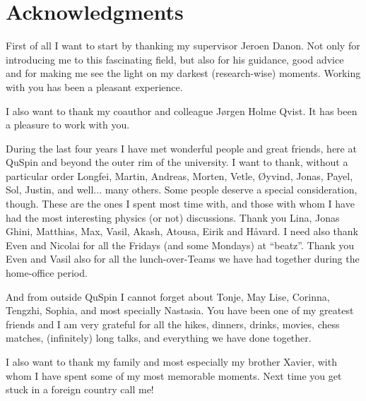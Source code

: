 
\chapter*{Acknowledgments\label{sec:ack}}

First of all I want to start by thanking my supervisor Jeroen Danon. Not only for introducing me to this fascinating field, but also for his guidance, good advice and for making me see the light on my darkest (research-wise) moments. Working with you has been a pleasant experience.

I also want to thank my coauthor and colleague J{\o}rgen Holme Qvist. It has been a pleasure to work with you.

During the last four years I have met wonderful people and great friends, here at QuSpin and beyond the outer rim of the university. I want to thank, without a particular order Longfei, Martin, Andreas, Morten, Vetle, {\O}yvind, Jonas, Payel, Sol, Justin, and well... many others.
%
Some people deserve a special consideration, though. These are the ones I spent most time with, and those with whom I have had the most interesting physics (or not) discussions. Thank you Lina, Jonas Ghini, Matthias, Max, Vasil, Akash, Atousa, Eirik and H{\aa}vard.
%
I need also thank Even and Nicolai for all the Fridays (and some Mondays) at ``beatz''. Thank you Even and Vasil also for all the lunch-over-Teams we have had together during the home-office period.

And from outside QuSpin I cannot forget about Tonje, May Lise, Corinna, Tengzhi, Sophia, and most specially Nastasia. You have been one of my greatest friends and I am very grateful for all the hikes, dinners, drinks, movies, chess matches, (infinitely) long talks, and everything we have done together.


I also want to thank my family and most especially my brother Xavier, with whom I have spent some of my most memorable moments. Next time you get stuck in a foreign country call me!

